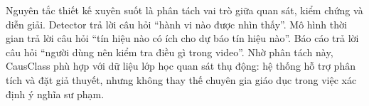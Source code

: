 Nguyên tắc thiết kế xuyên suốt là phân tách vai trò giữa quan sát, kiểm chứng và diễn giải. Detector trả lời câu hỏi ``hành vi nào được nhìn thấy''. Mô hình thời gian trả lời câu hỏi ``tín hiệu nào có ích cho dự báo tín hiệu nào''. Báo cáo trả lời câu hỏi ``người dùng nên kiểm tra điều gì trong video''. Nhờ phân tách này, CausClass phù hợp với dữ liệu lớp học quan sát thụ động: hệ thống hỗ trợ phân tích và đặt giả thuyết, nhưng không thay thế chuyên gia giáo dục trong việc xác định ý nghĩa sư phạm.
